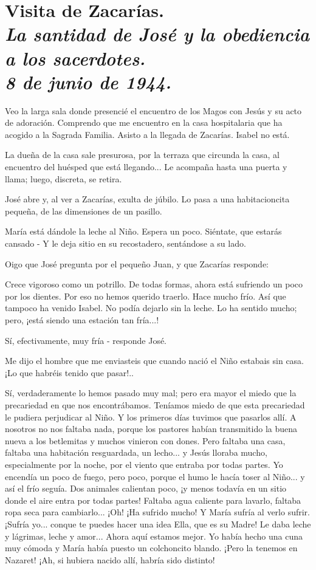 \documentclass[12pt, twoside, openright]{book} %
\begin{document}
\chapter*{Visita de Zacarías. \\ \normalfont\normalsize\textit{La santidad de José y la obediencia a los sacerdotes. \\ 8 de junio de 1944.}}

Veo la larga sala donde presencié el encuentro de los Magos con Jesús y su acto de adoración. Comprendo que me encuentro en la casa hospitalaria que ha acogido a la Sagrada Familia. Asisto a la llegada de Zacarías. Isabel no está. 

La dueña de la casa sale presurosa, por la terraza que circunda la casa, al encuentro del huésped que está llegando... Le acompaña hasta una puerta y llama; luego, discreta, se retira. 

José abre y, al ver a Zacarías, exulta de júbilo. Lo pasa a una habitacioncita pequeña, de las dimensiones de un pasillo. 

María está dándole la leche al Niño. Espera un poco. Siéntate, que estarás cansado - Y le deja sitio en su recostadero, sentándose a su lado. 

Oigo que José pregunta por el pequeño Juan, y que Zacarías responde: 

Crece vigoroso como un potrillo. De todas formas, ahora está sufriendo un poco por los dientes. Por eso no hemos querido traerlo. Hace mucho frío. Así que tampoco ha venido Isabel. No podía dejarlo sin la leche. Lo ha sentido mucho; pero, ¡está siendo una estación tan fría...! 

Sí, efectivamente, muy fría - responde José. 

Me dijo el hombre que me enviasteis que cuando nació el Niño estabais sin casa. ¡Lo que habréis tenido que pasar!.. 

Sí, verdaderamente lo hemos pasado muy mal; pero era mayor el miedo que la precariedad en que nos encontrábamos. Teníamos miedo de que esta precariedad le pudiera perjudicar al Niño. Y los primeros días tuvimos que pasarlos allí. A nosotros no nos faltaba nada, porque los pastores habían transmitido la buena nueva a los betlemitas y muchos vinieron con dones. Pero faltaba una casa, faltaba una habitación resguardada, un lecho... y Jesús lloraba mucho, especialmente por la noche, por el viento que entraba por todas partes. Yo encendía un poco de fuego, pero poco, porque el humo le hacía toser al Niño... y así el frío seguía. Dos animales calientan poco, ¡y menos todavía en un sitio donde el aire entra por todas partes! Faltaba agua caliente para lavarlo, faltaba ropa seca para cambiarlo... ¡Oh! ¡Ha sufrido mucho! Y María sufría al verlo sufrir. ¡Sufría yo... conque te puedes hacer una idea Ella, que es su Madre! Le daba leche y lágrimas, leche y amor... Ahora aquí estamos mejor. Yo había hecho una cuna muy cómoda y María había puesto un colchoncito blando. ¡Pero la tenemos en Nazaret! ¡Ah, si hubiera nacido allí, habría sido distinto! 
\end{document}
